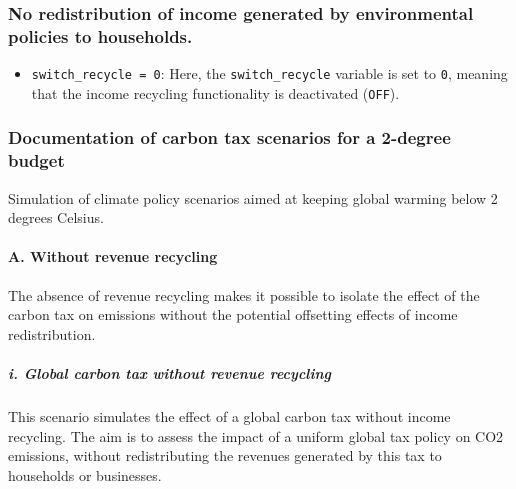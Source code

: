 \documentclass[
]{article}
\providecommand{\tightlist}{%
  \setlength{\itemsep}{0pt}\setlength{\parskip}{0pt}}
\begin{document}
\subsubsection{No redistribution of income generated by environmental
policies to
households.}\label{no-redistribution-of-income-generated-by-environmental-policies-to-households.}

\begin{itemize}
\tightlist
\item
  \texttt{switch\_recycle\ =\ 0}: Here, the \texttt{switch\_recycle}
  variable is set to \texttt{0}, meaning that the income recycling
  functionality is deactivated (\texttt{OFF}).
\end{itemize}

\subsubsection{Documentation of carbon tax scenarios for a 2-degree
budget}\label{documentation-of-carbon-tax-scenarios-for-a-2-degree-budget}

Simulation of climate policy scenarios aimed at keeping global warming
below 2 degrees Celsius.

\paragraph{A. Without revenue
recycling}\label{a.-without-revenue-recycling}

The absence of revenue recycling makes it possible to isolate the effect
of the carbon tax on emissions without the potential offsetting effects
of income redistribution.

\subparagraph{i. Global carbon tax without revenue
recycling}\label{i.-global-carbon-tax-without-revenue-recycling}

This scenario simulates the effect of a global carbon tax without income
recycling. The aim is to assess the impact of a uniform global tax
policy on CO2 emissions, without redistributing the revenues generated
by this tax to households or businesses.
\end{document}
